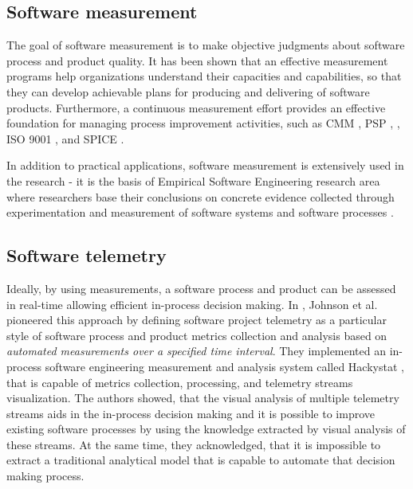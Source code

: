 \subsection{Software measurement}
The goal of software measurement is to make objective judgments about software process and product quality. 
It has been shown that an effective measurement programs help organizations understand their capacities and 
capabilities, so that they can develop achievable plans for producing and delivering of software products. 
Furthermore, a continuous measurement effort provides an effective foundation for managing process 
improvement activities, 
such as CMM \cite{citeulike:9962021}, 
PSP \cite{citeulike:8347315}, \cite{citeulike:5090131} \cite{citeulike:12929216}, 
ISO 9001 \cite{iso-standard}, and SPICE \cite{spice-standard}.

In addition to practical applications, software measurement is extensively used in the research - 
it is the basis of Empirical Software Engineering research area where researchers base their conclusions on 
concrete evidence collected through experimentation and measurement of software systems and software 
processes \cite{citeulike:766768}.

\subsection{Software telemetry}\label{section_software_telemetry}
Ideally, by using measurements, a software process and product can be assessed in real-time allowing efficient 
in-process decision making.
In \cite{citeulike:557296}, Johnson et al. pioneered this approach by defining software project telemetry as a 
particular style of software process and product metrics collection and analysis based on 
\textit{automated measurements over a specified time interval}. 
They implemented an in-process software engineering measurement and analysis system called Hackystat 
\cite{citeulike:12929227}, that is capable of metrics collection, processing, and telemetry streams visualization. 
The authors showed, that the visual analysis of multiple telemetry streams aids in the in-process decision making 
and it is possible to improve existing software processes by using the knowledge extracted by visual 
analysis of these streams. At the same time, they acknowledged, that it is impossible to extract a traditional 
analytical model that is capable to automate that decision making process.

